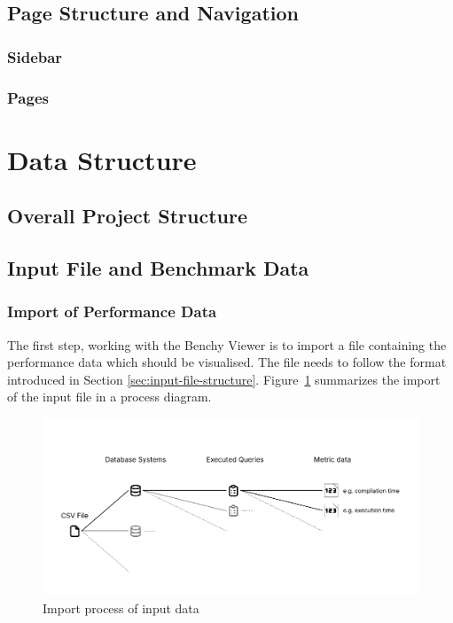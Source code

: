
\subsection{Page Structure and Navigation}
\subsubsection{Sidebar}
\subsubsection{Pages}

\section{Data Structure}
\subsection{Overall Project Structure}
\subsection{Input File and Benchmark Data}


\subsubsection{Import of Performance Data}

The first step, working with the Benchy Viewer is to import a file containing the performance data which should be visualised. The file needs to follow the format introduced in Section \ref{sec:input-file-structure}. Figure~\ref{fig:input-process-flow} summarizes the import of the input file in a process diagram.

\begin{figure}[h]
  \centering
  \includegraphics[width=1\linewidth]{figures/csv-structure.pdf}
  \caption{Import process of input data}
  \label{fig:input-process-flow}
\end{figure}

